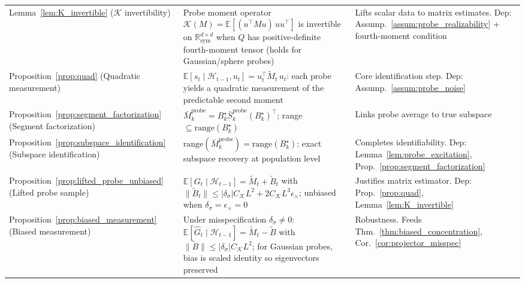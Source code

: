 \documentclass{article}
\newcommand{\R}{\mathbb{R}}
\newcommand{\E}{\mathbb{E}}
\newcommand{\cH}{\mathcal{H}}
\newcommand{\range}{\mathrm{range}}
\begin{document}
{\begin{longtable}{
  >{\raggedright\arraybackslash}p{}
  >{\raggedright\arraybackslash}p{}
  >{\raggedright\arraybackslash}p{}
}
Lemma~\ref{lem:K_invertible} \newline ($\mathcal K$ invertibility) &
  Probe moment operator $\mathcal K(M)\!=\!\E[(u^\top\! Mu)\,uu^\top]$ is invertible on $\R_{\mathrm{sym}}^{d\times d}$ when $Q$ has positive-definite fourth-moment tensor (holds for Gaussian/sphere probes) &
  Lifts scalar data to matrix estimates. Dep: Assump.~\ref{assum:probe_realizability} + fourth-moment condition \\

Proposition~\ref{prop:quad} \newline (Quadratic measurement) &
  $\E[s_t\mid\cH_{t-1},u_t]\!=\!u_t^\top\widetilde M_t\,u_t$: each probe yields a quadratic measurement of the predictable second moment &
  Core identification step. Dep: Assump.~\ref{assum:probe_noise} \\

Proposition~\ref{prop:segment_factorization} \newline (Segment factorization) &
  $\bar M_k^{\mathrm{probe}}\!=\!B_k^\star \bar S_k^{\mathrm{probe}}(B_k^\star)^\top$; range $\subseteq\range(B_k^\star)$ &
  Links probe average to true subspace \\

Proposition~\ref{prop:subspace_identification} \newline (Subspace identification) &
  $\range(\bar M_k^{\mathrm{probe}})\!=\!\range(B_k^\star)$: exact subspace recovery at population level &
  Completes identifiability. Dep: Lemma~\ref{lem:probe_excitation}, Prop.~\ref{prop:segment_factorization} \\

Proposition~\ref{prop:lifted_probe_unbiased} \newline (Lifted probe sample) &
  $\E[G_t\mid\cH_{t-1}]\!=\!\widetilde M_t + \widetilde B_t$ with $\|\widetilde B_t\| \le |\delta_\sigma|C_{\mathcal K}L^2 + 2C_{\mathcal K}L^3\epsilon_\times$; unbiased when $\delta_\sigma\!=\!\epsilon_\times\!=\!0$ &
  Justifies matrix estimator. Dep: Prop.~\ref{prop:quad}, Lemma~\ref{lem:K_invertible} \\

Proposition~\ref{prop:biased_measurement} \newline (Biased measurement) &
  Under misspecification $\delta_\sigma\!\neq\!0$: $\E[\hat G_t\mid\cH_{t-1}]\!=\!\widetilde M_t - \widetilde B$ with $\|\widetilde B\|\!\le\!|\delta_\sigma|C_{\mathcal K}L^2$; for Gaussian probes, bias is scaled identity so eigenvectors preserved &
  Robustness. Feeds Thm.~\ref{thm:biased_concentration}, Cor.~\ref{cor:projector_misspec} \\


\end{longtable}}
\end{document}
